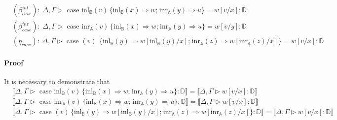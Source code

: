 \begin{equation*}
  \begin{split}
    &(\beta_{case}^{inl}): \hspace{3pt} \Delta,\Gamma \triangleright \text{ case } \text{inl}_{\mathbb{B}}(v) \hspace{2pt} \{\text{inl}_{\mathbb{B}} (x) \Rightarrow w ; \hspace{1pt} \text{inr}_{\mathbb{A}} (y) \Rightarrow u\}= w[v/x] : \mathbb{D} \\
    &(\beta_{case}^{inr}): \hspace{3pt} \Delta,\Gamma  \triangleright  \text{ case } \text{inr}_{\mathbb{A}}(v) \hspace{2pt} \{\text{inl}_{\mathbb{B}} (x) \Rightarrow w ; \hspace{1pt} \text{inr}_{\mathbb{A}} (y) \Rightarrow u\} = w[v/y] : \mathbb{D} \\ 
    & (\eta_{case}): \hspace{3pt} \Delta,\Gamma  \triangleright  \text{ case }(v)\ \hspace{2pt} \{\text{inl}_{\mathbb{B}} (y) \Rightarrow w [ \text{inl}_{\mathbb{B}}(y)/x] ; \hspace{1pt} \text{inr}_{\mathbb{A}} (z) \Rightarrow w [ \text{inr}_{\mathbb{A}}(z)/x]\} = w[v/x] : \mathbb{D}
  \end{split}
\end{equation*}

\paragraph{Proof} 


It is necessary to demonstrate that 
\begin{equation*}
  \begin{split}
  &\llbracket \Delta,\Gamma \triangleright \text{ case } \text{inl}_{\mathbb{B}}(v) \hspace{2pt} \{\text{inl}_{\mathbb{B}} (x) \Rightarrow w ; \hspace{1pt} \text{inr}_{\mathbb{A}} (y) \Rightarrow u\}: \mathbb{D}\rrbracket = \llbracket \Delta,\Gamma \triangleright w[v/x] : \mathbb{D} \rrbracket \\
  & \llbracket \Delta,\Gamma \triangleright \text{ case } \text{inr}_{\mathbb{A}}(v) \hspace{2pt} \{\text{inl}_{\mathbb{B}} (x) \Rightarrow w ; \hspace{1pt} \text{inr}_{\mathbb{A}} (y) \Rightarrow u\}: \mathbb{D}\rrbracket = \llbracket \Delta,\Gamma \triangleright w[v/x] : \mathbb{D} \rrbracket\\
  & \llbracket \Delta,\Gamma \triangleright \text{ case }(v) \hspace{2pt} \{\text{inl}_{\mathbb{B}} (y) \Rightarrow w [ \text{inl}_{\mathbb{B}}(y)/x] ; \hspace{1pt} \text{inr}_{\mathbb{A}} (z) \Rightarrow w [ \text{inr}_{\mathbb{A}}(z)/x]\}: \mathbb{D}\rrbracket = \llbracket \Delta,\Gamma \triangleright w[v/x] : \mathbb{D} \rrbracket
\end{split}
\end{equation*}

